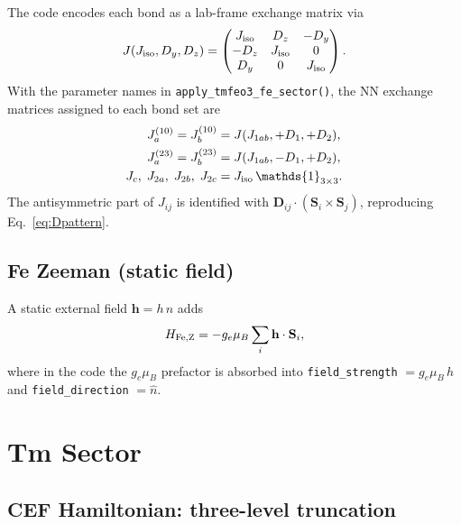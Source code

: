 \documentclass[11pt]{article}
\newcommand{\bS}{\mathbf{S}}
\newcommand{\bh}{\mathbf{h}}
\newcommand{\bD}{\mathbf{D}}
\begin{document}
The code encodes each bond as a lab-frame exchange matrix via
\begin{equation}
J(J_{\rm iso}, D_y, D_z) =
\begin{pmatrix}
J_{\rm iso} & D_z & -D_y \\
-D_z & J_{\rm iso} & 0 \\
D_y & 0 & J_{\rm iso}
\end{pmatrix}.
\end{equation}
With the parameter names in \texttt{apply\_tmfeo3\_fe\_sector()}, the
NN exchange matrices assigned to each bond set are
\begin{align}
J_a^{(10)} = J_b^{(10)} &= J(J_{1ab}, +D_1, +D_2), \notag\\
J_a^{(23)} = J_b^{(23)} &= J(J_{1ab}, -D_1, +D_2), \\
J_c,\; J_{2a},\; J_{2b},\; J_{2c} &= J_{\rm iso}\,\mathds{1}_{3\times 3}.\notag
\end{align}
The antisymmetric part of $J_{ij}$ is identified with
$\bD_{ij}\cdot(\bS_i\times\bS_j)$, reproducing Eq.~\eqref{eq:Dpattern}.

\subsection{Fe Zeeman (static field)}

A static external field $\bh = h\,\hat n$ adds
\begin{equation}
H_{\rm Fe,Z} = -g_e\mu_B\sum_i \bh\cdot\bS_i,
\end{equation}
where in the code the $g_e\mu_B$ prefactor is absorbed into
\texttt{field\_strength} $= g_e\mu_B\,h$ and
\texttt{field\_direction} $= \hat n$.

\section{Tm Sector}
\label{sec:Tm}

\subsection{CEF Hamiltonian: three-level truncation}
\end{document}
